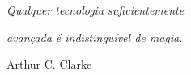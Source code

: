 $\!$\\
$\!$\\
$\!$\\
$\!$\\
$\!$\\
$\!$\\
$\!$\\
$\!$\\
$\!$\\
$\!$\\
$\!$\\
$\!$\\
$\!$\\
$\!$\\
$\!$\\
$\!$\\
$\!$\\
$\!$\\
$\!$\\
$\!$\\
$\!$\\
$\!$\\

\begin{flushright}
\textit{Qualquer tecnologia suficientemente}
\end{flushright}
\vspace{-1cm}
\begin{flushright}
\textit{avançada é indistinguível de magia.}
\end{flushright}
\begin{flushright}
Arthur C. Clarke
\end{flushright}

\thispagestyle{empty}